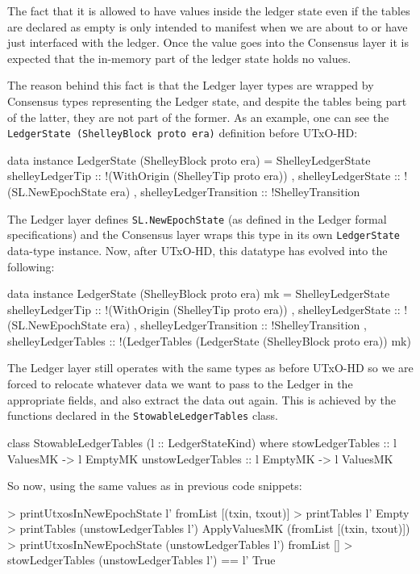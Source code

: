\documentclass[11pt,a4paper]{article}
\newcommand{\htt}[1]{\texttt{#1}}
\theoremstyle{definition}
\begin{document}
The fact that it is allowed to have values inside the ledger state even if the
tables are declared as empty is only intended to manifest when we are about to or
have just interfaced with the ledger. Once the value goes into the Consensus
layer it is expected that the in-memory part of the ledger state holds no
values.

The reason behind this fact is that the Ledger layer types are wrapped by
Consensus types representing the Ledger state, and despite the tables being part
of the latter, they are not part of the former. As an example, one can see the
\htt{LedgerState (ShelleyBlock proto era)} definition before UTxO-HD:

\begin{code}
  data instance LedgerState (ShelleyBlock proto era) = ShelleyLedgerState {
      shelleyLedgerTip        :: !(WithOrigin (ShelleyTip proto era))
    , shelleyLedgerState      :: !(SL.NewEpochState era)
    , shelleyLedgerTransition :: !ShelleyTransition
  }
\end{code}

The Ledger layer defines \htt{SL.NewEpochState} (as defined in the Ledger formal
specifications) and the Consensus layer wraps this type in its own
\htt{LedgerState} data-type instance. Now, after UTxO-HD, this datatype has
evolved into the following:

\begin{code}
data instance LedgerState (ShelleyBlock proto era) mk = ShelleyLedgerState {
      shelleyLedgerTip        :: !(WithOrigin (ShelleyTip proto era))
    , shelleyLedgerState      :: !(SL.NewEpochState era)
    , shelleyLedgerTransition :: !ShelleyTransition
    , shelleyLedgerTables     :: !(LedgerTables (LedgerState (ShelleyBlock proto era)) mk)
    }
\end{code}

The Ledger layer still operates with the same types as before UTxO-HD so we are
forced to relocate whatever data we want to pass to the Ledger in the
appropriate fields, and also extract the data out again. This is achieved by the
functions declared in the \htt{StowableLedgerTables} class.

\begin{code}
class StowableLedgerTables (l :: LedgerStateKind) where
  stowLedgerTables     :: l ValuesMK -> l EmptyMK
  unstowLedgerTables   :: l EmptyMK  -> l ValuesMK
\end{code}

So now, using the same values as in previous code snippets:
\begin{code}
  > printUtxosInNewEpochState l'
  fromList [(txin, txout)]
  > printTables l'
  Empty
  > printTables (unstowLedgerTables l')
  ApplyValuesMK (fromList [(txin, txout)])
  > printUtxosInNewEpochState (unstowLedgerTables l')
  fromList []
  > stowLedgerTables (unstowLedgerTables l') == l'
  True
\end{code}
\end{document}
